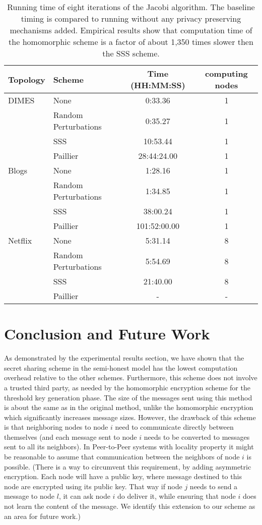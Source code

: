 \documentclass[10pt]{svjour3}
\begin{document}
\begin{table*}
  \centering
\begin{tabular}{|l|l|c|c|}
\hline
  Topology & Scheme & Time (HH:MM:SS) & computing nodes\\ \hline
  DIMES & None & 0:33.36 & 1\\
  & Random Perturbations & 0:35.27 & 1\\
         & SSS & 10:53.44 & 1\\
          & Paillier & 28:44:24.00 & 1\\ \hline
  Blogs & None & 1:28.16 & 1\\
        & Random Perturbations & 1:34.85 & 1\\
         & SSS & 38:00.24 & 1\\
          & Paillier & 101:52:00.00 & 1\\ \hline
  Netflix & None & 5:31.14 & 8\\
  & Random Perturbations & 5:54.69 & 8\\
         & SSS & 21:40.00 & 8 \\
          & Paillier & - & -\\
   \hline
\end{tabular}
  \caption{Running time of eight iterations of the Jacobi algorithm. The baseline timing is compared to running without
  any privacy preserving mechanisms added. Empirical results show that computation time of the homomorphic scheme is a factor of about 1,350 times slower
  then the SSS scheme.}\label{tb3}
\end{table*}


\section{Conclusion and Future Work}
\label{Conclusion} As demonstrated by the experimental results
section, we have shown that the secret sharing scheme in the
semi-honest model has the lowest computation overhead relative to
the other schemes. Furthermore, this scheme does not involve a
trusted third party, as needed by the homomorphic encryption
scheme for the threshold key generation phase. The size of the
messages sent using this method is about the same as in the
original method, unlike the homomorphic encryption which
significantly increases message sizes. However, the  drawback of
this scheme is that neighboring nodes to node $i$ need to
communicate directly between themselves (and each message sent to
node $i$ needs to be converted to messages sent to all its
neighbors). In Peer-to-Peer systems with locality property it
might be reasonable to assume that communication between the
neighbors of node $i$ is possible. (There is a way to circumvent
this requirement, by adding asymmetric encryption. Each node will
have a public key, where message destined to this node are
encrypted using its public key. That way if node $j$ needs to send
a message to node $l$, it can ask node $i$ do deliver it, while
ensuring that node $i$ does not learn the  content of the message.
We identify this extension to our scheme as an area for future
work.)
\end{document}
